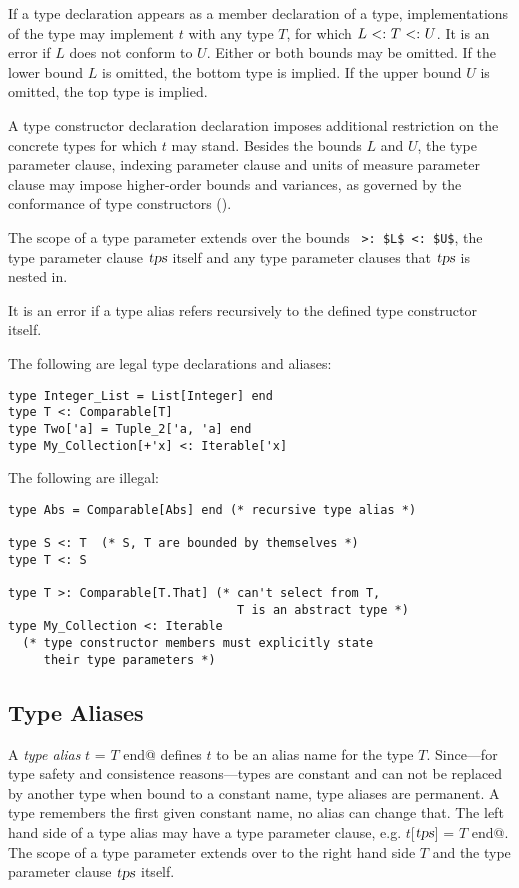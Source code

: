 If a type declaration appears as a member declaration of a type, implementations of the type may implement $t$ with any type $T$, for which $L \conforms T \conforms U$. It is an error if $L$ does not conform to $U$. Either or both bounds may be omitted. If the lower bound $L$ is omitted, the bottom type  is implied. If the upper bound $U$ is omitted, the top type  is implied. 

A type constructor declaration declaration imposes additional restriction on the concrete types for which $t$ may stand. Besides the bounds $L$ and $U$, the type parameter clause, indexing parameter clause and units of measure parameter clause may impose higher-order bounds and variances, as governed by the conformance of type constructors ().

The scope of a type parameter extends over the bounds ~\lstinline!>: $L$ <: $U$!, the type parameter clause $\mbox{\sl tps}$ itself and any type parameter clauses that $\mbox{\sl tps}$ is nested in.

It is an error if a type alias refers recursively to the defined type constructor itself. 

\example The following are legal type declarations and aliases:
\begin{lstlisting}
type Integer_List = List[Integer] end
type T <: Comparable[T]
type Two['a] = Tuple_2['a, 'a] end
type My_Collection[+'x] <: Iterable['x]
\end{lstlisting}

The following are illegal:
\begin{lstlisting}
type Abs = Comparable[Abs] end (* recursive type alias *)

type S <: T  (* S, T are bounded by themselves *)
type T <: S

type T >: Comparable[T.That] (* can't select from T,
                                T is an abstract type *)
type My_Collection <: Iterable
  (* type constructor members must explicitly state
     their type parameters *)
\end{lstlisting}

\subsection{Type Aliases}
A {\em type alias} \lstinline@type $t$ = $T$ end@ defines $t$ to be an alias name for the type $T$. Since---for type safety and consistence reasons---types are constant and can not be replaced by another type when bound to a constant name, type aliases are permanent. A type remembers the first given constant name, no alias can change that. The left hand side of a type alias may have a type parameter clause, e.g. \lstinline@type $t$[$\mbox{\sl tps}$] = $T$ end@. The scope of a type parameter extends over to the right hand side $T$ and the type parameter clause $\mbox{\sl tps}$ itself. 

